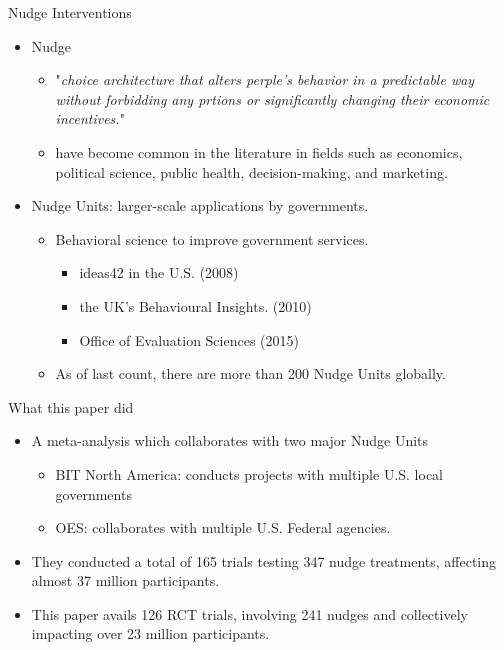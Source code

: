 \documentclass[dvipdfmx,11pt]{beamer}
\begin{document}
\begin{frame}{Nudge Interventions}
  \begin{itemize}
    \item Nudge 
    \begin{itemize}
      \item "\textit{choice architecture that alters perple's behavior in a predictable way without forbidding any prtions or significantly changing their economic incentives.}"
      \item have become common in the literature in fields such as economics, political science, public health, decision-making, and marketing.
    \end{itemize}
    \item Nudge Units: larger-scale applications by governments.
    \begin{itemize}
      \item Behavioral science to improve government services.
      \begin{itemize}
        \item ideas42 in the U.S. (2008)
        \item the UK's Behavioural Insights. (2010)
        \item Office of Evaluation Sciences (2015)
      \end{itemize}
      \item As of last count, there are more than 200 Nudge Units globally.
    \end{itemize}
  \end{itemize}
\end{frame}

\begin{frame}{What this paper did}
  \begin{itemize}
    \item A meta-analysis which collaborates with two major Nudge Units
    \begin{itemize}
      \item BIT North America: conducts projects with multiple U.S. local governments 
      \item OES: collaborates with multiple U.S. Federal agencies.
    \end{itemize}
    \item They conducted a total of 165 trials testing 347 nudge treatments, affecting almost 37 million participants.
    \item This paper avails 126 RCT trials, involving 241 nudges and collectively impacting over 23 million participants.
  \end{itemize}
\end{frame}
\end{document}
